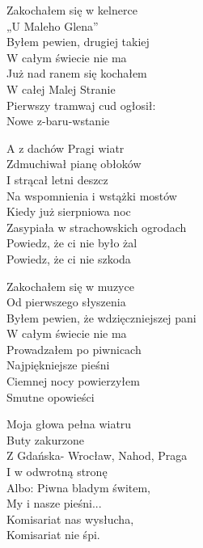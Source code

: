 \begin{text}
Zakochałem się w kelnerce\\
„U Maleho Glena”\\
Byłem pewien, drugiej takiej\\
W całym świecie nie ma\\
Już nad ranem się kochałem\\
W całej Malej Stranie\\
Pierwszy tramwaj cud ogłosił:\\
Nowe z-baru-wstanie

\vin A z dachów Pragi wiatr\\
\vin Zdmuchiwał pianę obłoków\\
\vin I strącał letni deszcz\\
\vin Na wspomnienia i wstążki mostów\\
\vin Kiedy już sierpniowa noc\\
\vin Zasypiała w strachowskich ogrodach\\
\vin Powiedz, że ci nie było żal\\
\vin Powiedz, że ci nie szkoda

Zakochałem się w muzyce\\
Od pierwszego słyszenia\\
Byłem pewien, że wdzięczniejszej pani\\
W całym świecie nie ma\\
Prowadzałem po piwnicach\\
Najpiękniejsze pieśni\\
Ciemnej nocy powierzyłem\\
Smutne opowieści

Moja głowa pełna wiatru\\
Buty zakurzone\\
Z Gdańska- Wrocław, Nahod, Praga\\
I w odwrotną stronę\\
Albo: Piwna bladym świtem,\\
My i nasze pieśni...\\
Komisariat nas wysłucha,\\
Komisariat nie śpi.
\end{text}